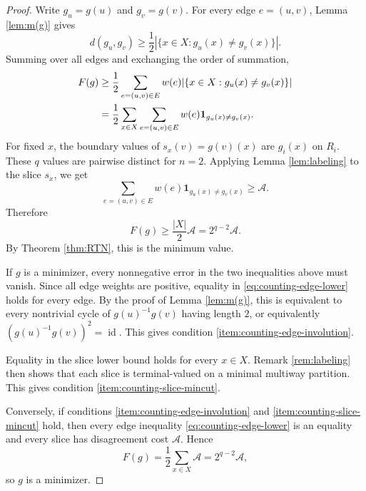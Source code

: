 \documentclass[11pt,oneside,letterpaper]{article}
\numberwithin{equation}{section}
\theoremstyle{definition}
\theoremstyle{remark}
\DeclareMathOperator{\id}{id}
\begin{document}
\begin{proof}
  Write $g_u=g(u)$ and $g_v=g(v)$.  For every edge $e=(u,v)$, Lemma
  \ref{lem:m(g)} gives
  \begin{equation}
    \label{eq:counting-edge-lower}
    d(g_u,g_v)\ge
    \frac{1}{2}|\{x\in X:g_u(x)\ne g_v(x)\}|.
  \end{equation}
  Summing over all edges and exchanging the order of summation,
  \begin{align}
    F(g)
    &\ge \frac{1}{2}\sum_{e=(u,v)\in E} w(e)
      |\{x\in X:g_u(x)\ne g_v(x)\}| \notag\\
    &=\frac{1}{2}\sum_{x\in X}\sum_{e=(u,v)\in E}
      w(e)\mathbf{1}_{g_u(x)\ne g_v(x)}. \label{eq:counting-slice-lower}
  \end{align}
  For fixed $x$, the boundary values of $s_x(v)=g(v)(x)$ are
  $g_i(x)$ on $R_i$.  These $q$ values are pairwise distinct for
  $n=2$.  Applying Lemma \ref{lem:labeling} to the slice $s_x$, we get
  \begin{equation}
    \sum_{e=(u,v)\in E} w(e)\mathbf{1}_{g_u(x)\ne g_v(x)}
    \ge \mathcal{A}.
  \end{equation}
  Therefore
  \begin{equation}
    F(g)\ge \frac{|X|}{2}\mathcal{A}=2^{q-2}\mathcal{A}.
  \end{equation}
  By Theorem \ref{thm:RTN}, this is the minimum value.

  If $g$ is a minimizer, every nonnegative error in the two inequalities
  above must vanish.  Since all edge weights are positive, equality in
  \eqref{eq:counting-edge-lower} holds for every edge.  By the proof of
  Lemma \ref{lem:m(g)}, this is equivalent to every nontrivial cycle of
  $g(u)^{-1}g(v)$ having length $2$, or equivalently
  $(g(u)^{-1}g(v))^2=\id$.  This gives condition
  \ref{item:counting-edge-involution}.

  Equality in the slice lower bound holds for every $x\in X$.  Remark
  \ref{rem:labeling} then shows that each slice is
  terminal-valued on a minimal multiway partition.  This gives condition
  \ref{item:counting-slice-mincut}.

  Conversely, if conditions \ref{item:counting-edge-involution} and
  \ref{item:counting-slice-mincut} hold, then every edge inequality
  \eqref{eq:counting-edge-lower} is an equality and every slice has
  disagreement cost $\mathcal{A}$.  Hence
  \begin{equation}
    F(g)=\frac{1}{2}\sum_{x\in X}\mathcal{A}
    =2^{q-2}\mathcal{A},
  \end{equation}
  so $g$ is a minimizer.
\end{proof}
\end{document}
